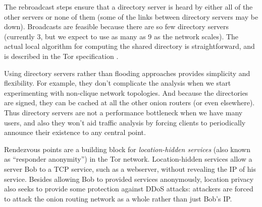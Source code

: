 \documentclass[times,10pt,twocolumn]{article}
\begin{document}
The rebroadcast steps ensure that a directory server is heard by either
all of the other servers or none of them (some of the links between
directory servers may be down). Broadcasts are feasible because there
are so few directory servers (currently 3, but we expect to use as many
as 9 as the network scales). The actual local algorithm for computing
the shared directory is straightforward, and is described in the Tor
specification \cite{tor-spec}.

Using directory servers rather than flooding approaches provides
simplicity and flexibility. For example, they don't complicate
the analysis when we start experimenting with non-clique network
topologies. And because the directories are signed, they can be cached at
all the other onion routers (or even elsewhere). Thus directory servers
are not a performance bottleneck when we have many users, and also they
won't aid traffic analysis by forcing clients to periodically announce
their existence to any central point.



\label{sec:rendezvous}

Rendezvous points are a building block for \emph{location-hidden
services} (also known as ``responder anonymity'') in the Tor
network.  Location-hidden services allow a server Bob to a TCP
service, such as a webserver, without revealing the IP of his service.
Besides allowing Bob to provided services anonymously, location
privacy also seeks to provide some protection against DDoS attacks:
attackers are forced to attack the onion routing network as a whole
rather than just Bob's IP.
\end{document}
